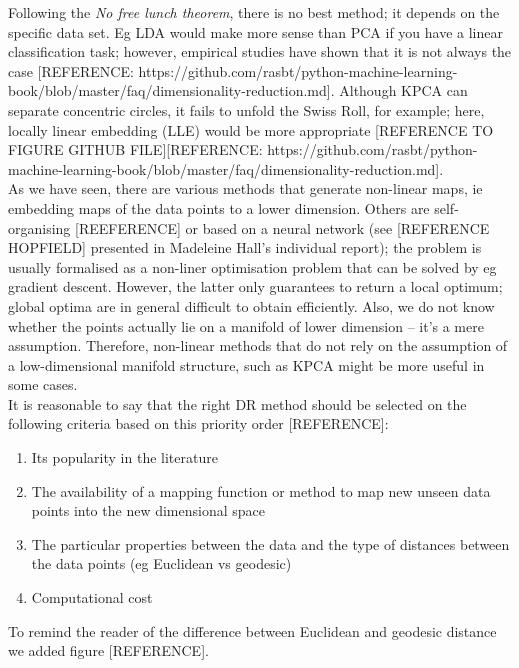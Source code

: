 \documentclass[journal, a4paper]{IEEEtran}
\begin{document}
Following the \textit{No free lunch theorem}, there is no best method; it depends on the specific data set.
Eg LDA would make more sense than PCA if you have a linear classification task; however, empirical studies have shown that it is not always the case [REFERENCE: https://github.com/rasbt/python-machine-learning-book/blob/master/faq/dimensionality-reduction.md]. Although KPCA can separate concentric circles, it fails to unfold the Swiss Roll, for example; here, locally linear embedding (LLE) would be more appropriate [REFERENCE TO FIGURE GITHUB FILE][REFERENCE: https://github.com/rasbt/python-machine-learning-book/blob/master/faq/dimensionality-reduction.md]. \\
As we have seen, there are various methods that generate non-linear maps, ie embedding maps of the data points to a lower dimension. Others are self-organising [REEFERENCE] or based on a neural network (see [REFERENCE HOPFIELD] presented in Madeleine Hall's individual report); the problem is usually formalised as a non-liner optimisation problem that can be solved by eg gradient descent. However, the latter only guarantees to return a local optimum; global optima are in general difficult to obtain efficiently. Also, we do not know whether the points actually lie on a manifold of lower dimension -- it's a mere assumption.
Therefore, non-linear methods that do not rely on the assumption of a low-dimensional manifold structure, such as KPCA might be more useful in some cases. 
\\
It is reasonable to say that the right DR method should be selected on the following criteria based on this priority order [REFERENCE]:
\begin{enumerate}
\item Its popularity in the literature
\item The availability of a mapping function or method to map new unseen data points into the new dimensional space
\item The particular properties between the data and the type of distances between the data points (eg Euclidean vs geodesic)
\item Computational cost
\end{enumerate}


To remind the reader of the difference between Euclidean and geodesic distance we added figure [REFERENCE].
\\
\end{document}
